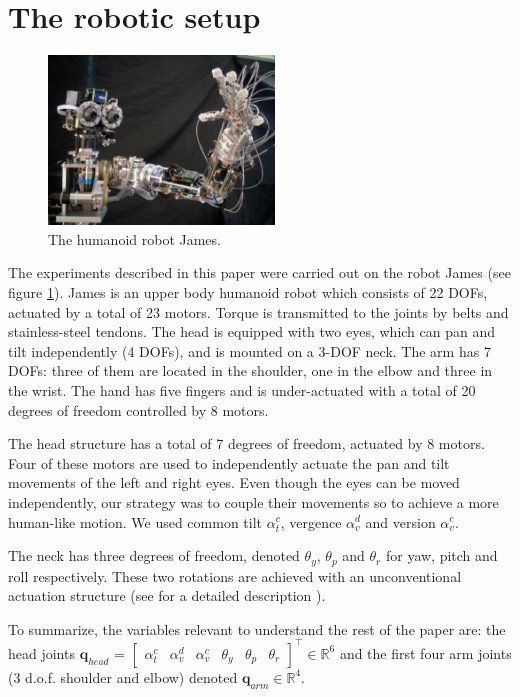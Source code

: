 \section{The robotic setup}
\label{Sec:setup}

\begin{figure}
\centering
\includegraphics[width=60mm]{Figure/James1.eps}
\caption{The humanoid robot James.}
\label{Fig:PicureJames}
\end{figure}

The experiments described in this paper were carried out on the robot 
James (see figure \ref{Fig:PicureJames}). James is an upper body 
humanoid robot which consists of 22 DOFs, actuated by a total of 
23 motors. Torque is transmitted to the joints by belts and 
stainless-steel tendons. The head is equipped with two eyes, which 
can pan and tilt independently (4 DOFs), and is mounted on a 3-DOF 
neck. The arm has 7 DOFs: three of them are located in the shoulder, 
one in the elbow and three in the wrist. The hand has five fingers 
and is under-actuated with a total of 20 degrees of freedom controlled 
by 8 motors. 

The head structure has a total of 7 degrees of freedom, actuated by 8 
motors. Four of these motors are used to independently actuate the pan 
and tilt movements of the left and right eyes. Even though the eyes 
can be moved independently, our strategy was to couple their movements 
so to achieve a more human-like motion. We used common tilt 
$\alpha_t^c$, vergence $\alpha_v^d$ and version $\alpha_v^c$. 

The neck has three degrees of freedom, denoted $\theta_y$, 
$\theta_p$ and $\theta_r$ for yaw, pitch and roll respectively. These 
two rotations are achieved with an unconventional actuation structure 
(see for a detailed description \cite{jamone06james}). 

To summarize, the variables relevant to understand the rest of the paper
are: the head joints 
$\mathbf q_{head}$ = $\begin{bmatrix} \alpha_t^c & \alpha_v^d & \alpha_v^c & \theta_y & \theta_p & \theta_r \end{bmatrix}^\top \in \mathbb R^6$ and the first four arm joints (3 d.o.f. shoulder and elbow) denoted $\mathbf q_{arm} \in \mathbb R^4$.
